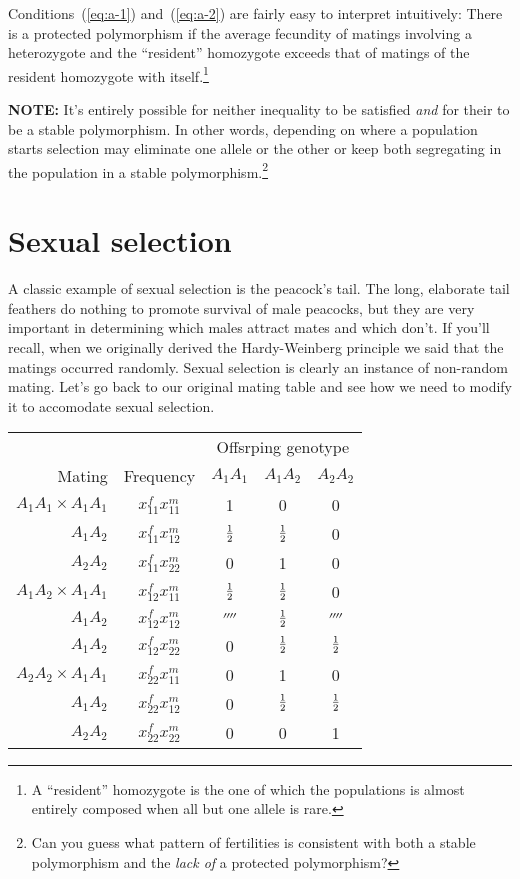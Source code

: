 \documentclass[12pt]{article}
\begin{document}
Conditions~(\ref{eq:a-1}) and~(\ref{eq:a-2}) are fairly easy to
interpret intuitively: There is a protected polymorphism if the
average fecundity of matings involving a heterozygote and the
``resident'' homozygote exceeds that of matings of the resident
homozygote with itself.\footnote{A ``resident'' homozygote is the one
  of which the populations is almost entirely composed when all but
  one allele is rare.}

{\bf NOTE:} It's entirely possible for neither inequality to be
satisfied {\it and\/} for their to be a stable polymorphism. In other
words, depending on where a population starts selection may eliminate
one allele or the other or keep both segregating in the population in
a stable polymorphism.\footnote{Can you guess what pattern of
  fertilities is consistent with both a stable polymorphism and the
  {\it lack of\/} a protected polymorphism?}

\section*{Sexual selection}

A classic example of sexual selection is the peacock's tail. The
long, elaborate tail feathers do nothing to promote survival of male
peacocks, but they are very important in determining which males
attract mates and which don't. If you'll recall, when we originally
derived the Hardy-Weinberg principle we said that the matings occurred
randomly. Sexual selection is clearly an instance of non-random
mating. Let's go back to our original mating table and see how we need
to modify it to accomodate sexual selection.

\begin{center}
\begin{tabular}{rcccc}
                       &           & \multicolumn{3}{c}{Offsrping genotype} \\
Mating                 & Frequency     & $A_1A_1$ & $A_1A_2$ & $A_2A_2$ \\
\hline
$A_1A_1 \times A_1A_1$ & $x_{11}^fx_{11}^m$     &        1 &        0 &        0 \\
              $A_1A_2$ & $x_{11}^fx_{12}^m$ &    $\frac{1}{2}$ &    $\frac{1}{2}$ &        0 \\
              $A_2A_2$ & $x_{11}^fx_{22}^m$ &        0 &        1 &        0 \\
$A_1A_2 \times A_1A_1$ & $x_{12}^fx_{11}^m$ &    $\frac{1}{2}$ &    $\frac{1}{2}$ &        0 \\ 
              $A_1A_2$ & $x_{12}^fx_{12}^m$     &  $\fourth$ &    $\frac{1}{2}$ &  $\fourth$ \\
              $A_1A_2$ & $x_{12}^fx_{22}^m$ &        0 &    $\frac{1}{2}$ &    $\frac{1}{2}$ \\
$A_2A_2 \times A_1A_1$ & $x_{22}^fx_{11}^m$ &        0 &        1 &        0 \\
              $A_1A_2$ & $x_{22}^fx_{12}^m$ &        0 &    $\frac{1}{2}$ &    $\frac{1}{2}$ \\   
              $A_2A_2$ & $x_{22}^fx_{22}^m$     &        0 &
0 & 1 \\
\end{tabular}
\end{center}
\end{document}
